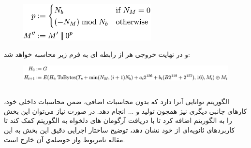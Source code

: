 \begin{figure}[H]
	\centering
	\includegraphics[width=7cm]{Images/Introduction/ubi_equation_1.png}	
\end{figure}
و در نهایت خروجی هر  از رابطه ای به فرم زیر محاسبه خواهد شد:
\begin{figure}[H]
	\centering
	\includegraphics[width=14cm]{Images/Introduction/ubi_equation_2.png}	
\end{figure}
\subsection{
}
الگوریتم 
توانایی آنرا دارد که بدون محاسبات اضافی، ضمن محاسبات داخلی خود، کار‌های جانبی دیگری نیز همچون تولید 
  و ...
انجام دهد. در صورت نیاز می‌توان این بخش را به الگوریتم اضافه کرد تا با دریافت آرگومان های دلخواه به الگوریتم کمک کند تا کاربرد‌های ثانویه‌ای از خود نشان دهد، توضیح ساختار اجرایی دقیق این بخش به این مقاله نامربوط واز حوصله‌ي آن خارج است.